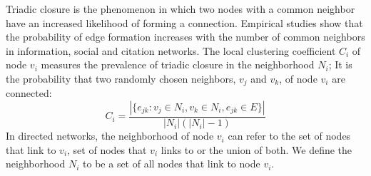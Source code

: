 

Triadic closure \cite{simmel1950sociology, newman2001clustering} is the phenomenon in which two nodes with a
common neighbor have an increased likelihood of forming a connection.
Empirical studies \cite{kossinets2006empirical} show that the probability of edge formation
increases with the number of common neighbors in information, social and citation networks. The local clustering coefficient
$C_i$ of node $v_i$ measures the prevalence of triadic closure in the
neighborhood $N_i$; It is the probability that two randomly chosen neighbors, $v_j$ and $v_k$,
of node $v_i$ are connected:
$$ C_i = \frac{|\{e_{jk} : v_j \in N_i, v_k \in N_i, e_{jk} \in E\}|}{|N_i|(|N_i|-1)}$$
In directed networks, the neighborhood of node $v_i$ can refer to the set of
nodes that link to $v_i$, set of nodes that $v_i$ links to or the union of
both. We define the neighborhood $N_i$ to be a set of all nodes that link to
node $v_i$.


